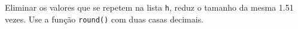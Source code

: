\documentclass[12pt,varwidth=16cm,border=1pt]{standalone}
\begin{document}
Eliminar os valores que se repetem na lista \verb+h+, reduz o tamanho da mesma 1.51 vezes. Use a função \verb+round()+ com duas casas decimais.

\questiomfalse
\end{document}

